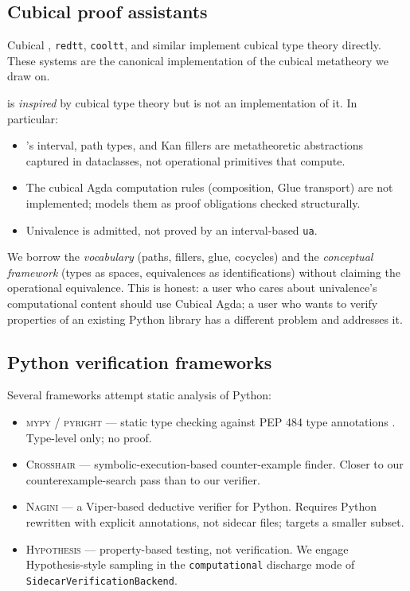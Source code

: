 \subsection{Cubical proof assistants}

Cubical \Agda{} \citep{ABCFHL, ABCHFL2017}, \texttt{redtt}, \texttt{cooltt}, and
similar implement cubical type theory directly.  These systems are
the canonical implementation of the cubical metatheory we draw on.

\Deppy{} is \emph{inspired} by cubical type theory but is not an
implementation of it.  In particular:
\begin{itemize}[leftmargin=1.7em]
  \item \Deppy{}'s interval, path types, and Kan fillers are
    metatheoretic abstractions captured in dataclasses, not
    operational primitives that compute.
  \item The cubical Agda computation rules (composition, Glue
    transport) are not implemented; \Deppy{} models them as proof
    obligations checked structurally.
  \item Univalence is admitted, not proved by an interval-based
    \texttt{ua}.
\end{itemize}

We borrow the \emph{vocabulary} (paths, fillers, glue, cocycles)
and the \emph{conceptual framework} (types as spaces, equivalences
as identifications) without claiming the operational equivalence.
This is honest: a user who cares about univalence's computational
content should use Cubical Agda; a user who wants to verify
properties of an existing Python library has a different
problem and \Deppy{} addresses it.

\subsection{Python verification frameworks}

Several frameworks attempt static analysis of Python:
\begin{itemize}[leftmargin=1.7em]
  \item \textsc{mypy} / \textsc{pyright} --- static type checking
    against PEP 484 type annotations \citep{PEP484}.  Type-level
    only; no proof.
  \item \textsc{Crosshair} --- symbolic-execution-based
    counter-example finder.  Closer to our counterexample-search
    pass than to our verifier.
  \item \textsc{Nagini} --- a Viper-based deductive verifier for
    Python.  Requires Python rewritten with explicit annotations,
    not sidecar files; targets a smaller subset.
  \item \textsc{Hypothesis} --- property-based testing, not
    verification.  We engage Hypothesis-style sampling in the
    \texttt{computational} discharge mode of
    \texttt{SidecarVerificationBackend}.
\end{itemize}

